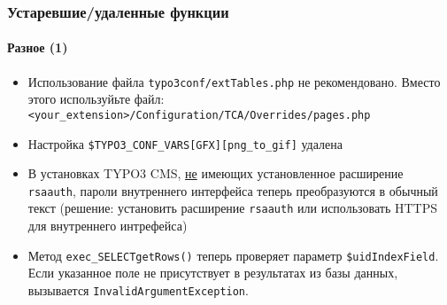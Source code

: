 \begin{frame}[fragile]
	\frametitle{Устаревшие/удаленные функции}
	\framesubtitle{Разное (1)}

	\begin{itemize}

		\item Использование файла \texttt{typo3conf/extTables.php} не рекомендовано.\newline
			Вместо этого используйьте файл:\newline
			\smaller\texttt{<your\_extension>/Configuration/TCA/Overrides/pages.php}\normalsize

		\item Настройка \texttt{\$TYPO3\_CONF\_VARS[GFX][png\_to\_gif]} удалена

		\item В установках TYPO3 CMS, \underline{не} имеющих установленное расширение
			\texttt{rsaauth}, пароли внутреннего интерфейса теперь преобразуются в обычный текст\newline
			\small(решение: установить расширение \texttt{rsaauth} или использовать HTTPS для внутреннего интрефейса)\normalsize

		\item Метод \texttt{exec\_SELECTgetRows()} теперь проверяет параметр \texttt{\$uidIndexField}.
			Если указанное поле не присутствует в результатах из базы данных, вызывается
			\texttt{InvalidArgumentException}.

	\end{itemize}

\end{frame}


